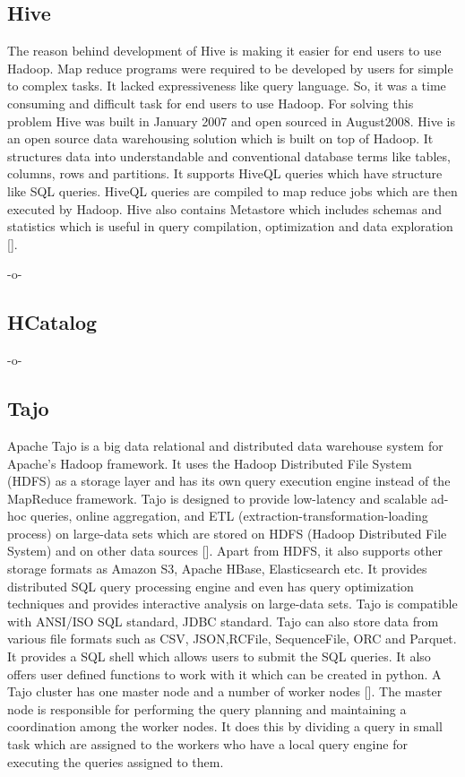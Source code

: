 \subsection{Hive}
     
The reason behind development of Hive is making it easier for end
users to use Hadoop. Map reduce programs were required to be developed
by users for simple to complex tasks. It lacked expressiveness like
query language. So, it was a time consuming and difficult task for end
users to use Hadoop. For solving this problem Hive was built in
January 2007 and open sourced in August2008.  Hive is an open source
data warehousing solution which is built on top of Hadoop. It
structures data into understandable and conventional database terms
like tables, columns, rows and partitions. It supports HiveQL queries
which have structure like SQL queries. HiveQL queries are compiled to
map reduce jobs which are then executed by Hadoop.  Hive also contains
Metastore which includes schemas and statistics which is useful in
query compilation, optimization and data exploration [\cite{www-hive}].

     -o-

\subsection{HCatalog}

-o- 

\subsection{Tajo}

Apache Tajo is a big data relational and distributed data warehouse
system for Apache's Hadoop framework\cite{www-apache-tajo}. It uses
the Hadoop Distributed File System (HDFS) as a storage layer and has
its own query execution engine instead of the MapReduce
framework. Tajo is designed to provide low-latency and scalable ad-hoc
queries, online aggregation, and ETL
(extraction-transformation-loading process) on large-data sets which
are stored on HDFS (Hadoop Distributed File System) and on other data
sources [\cite{www-tutorialspoint-tajo}]. Apart from HDFS, it also
supports other storage formats as Amazon S3, Apache HBase,
Elasticsearch etc. It provides distributed SQL query processing engine
and even has query optimization techniques and provides interactive
analysis on large-data sets. Tajo is compatible with ANSI/ISO SQL
standard, JDBC standard. Tajo can also store data from various file
formats such as CSV, JSON,RCFile, SequenceFile, ORC and Parquet. It
provides a SQL shell which allows users to submit the SQL queries. It
also offers user defined functions to work with it which can be
created in python. A Tajo cluster has one master node and a number of
worker nodes [\cite{www-tutorialspoint-tajo}]. The master node is
responsible for performing the query planning and maintaining a
coordination among the worker nodes. It does this by dividing a query
in small task which are assigned to the workers who have a local query
engine for executing the queries assigned to them.

